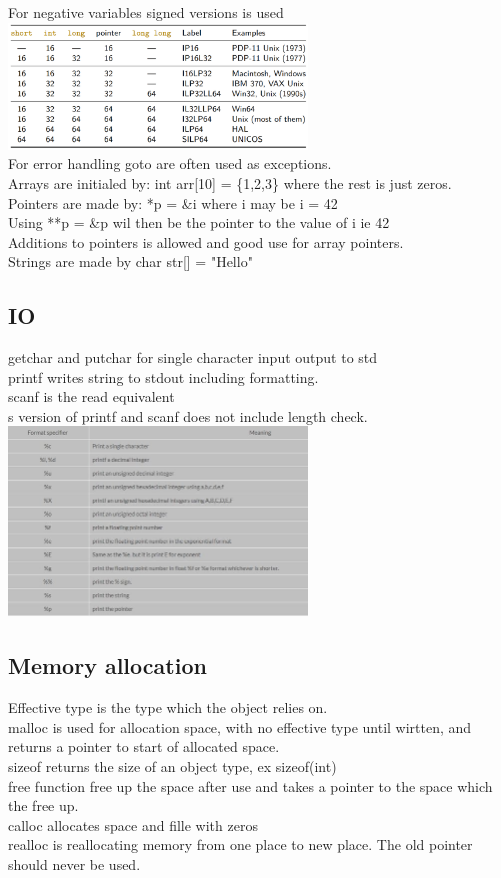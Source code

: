 \documentclass[12pt, a4paper]{article}
\begin{document}
		For negative variables signed versions is used\\
		\includegraphics[width=300px]{assets/cDataSize.png}\\
		For error handling goto are often used as exceptions.\\
		Arrays are initialed by: int arr[10] = \{1,2,3\} where the rest is just zeros.\\
		Pointers are made by: *p = \&i where i may be i = 42\\
		Using **p = \&p wil then be the pointer to the value of i ie 42\\
		Additions to pointers is allowed and good use for array pointers.\\
		Strings are made by char str[] = "Hello"
		\subsection{IO}
			getchar and putchar for single character input output to std\\
			printf writes string to stdout including formatting.\\
			scanf is the read equivalent\\
			s version of printf and scanf does not include length check.\\
			\includegraphics[width=300px]{assets/printFormatters.jpg}
		\subsection{Memory allocation}
			Effective type is the type which the object relies on.\\
			malloc is used for allocation space, with no effective type until wirtten, and returns a pointer to start of allocated space.\\
			sizeof returns the size of an object type, ex sizeof(int)\\
			free function free up the space after use and takes a pointer to the space which the free up.\\
			calloc allocates space and fille with zeros\\
			realloc is reallocating memory from one place to new place. The old pointer should never be used.\\
\end{document}
